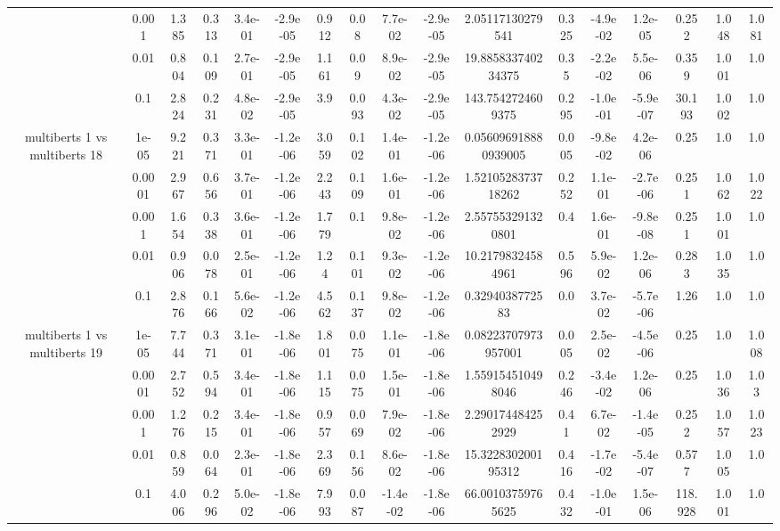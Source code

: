 \begin{tabular}{|c|c|c|c|c|c|c|c|c|c|c|c|c|c|c|c|c|}
 & 0.001 & 1.385 & 0.313 & 3.4e-01 & -2.9e-05 & 0.912 & 0.08 & 7.7e-02 & -2.9e-05 & 2.05117130279541 & 0.325 & -4.9e-02 & 1.2e-05 & 0.252 & 1.048 & 1.081 \\
 & 0.01 & 0.804 & 0.109 & 2.7e-01 & -2.9e-05 & 1.161 & 0.09 & 8.9e-02 & -2.9e-05 & 19.885833740234375 & 0.35 & -2.2e-02 & 5.5e-06 & 0.359 & 1.001 & 1.0 \\
 & 0.1 & 2.824 & 0.231 & 4.8e-02 & -2.9e-05 & 3.9 & 0.093 & 4.3e-02 & -2.9e-05 & 143.7542724609375 & 0.295 & -1.0e-01 & -5.9e-07 & 30.193 & 1.002 & 1.0 \\
\hline
\multirow{5}{*}{multiberts 1 vs multiberts 18} & 1e-05 & 9.221 & 0.371 & 3.3e-01 & -1.2e-06 & 3.059 & 0.102 & 1.4e-01 & -1.2e-06 & 0.056096918880939005 & 0.005 & -9.8e-02 & 4.2e-06 & 0.25 & 1.0 & 1.0 \\
 & 0.0001 & 2.967 & 0.656 & 3.7e-01 & -1.2e-06 & 2.243 & 0.109 & 1.6e-01 & -1.2e-06 & 1.5210528373718262 & 0.252 & 1.1e-01 & -2.7e-06 & 0.251 & 1.062 & 1.022 \\
 & 0.001 & 1.654 & 0.338 & 3.6e-01 & -1.2e-06 & 1.779 & 0.1 & 9.8e-02 & -1.2e-06 & 2.557553291320801 & 0.4 & 1.6e-01 & -9.8e-08 & 0.251 & 1.001 & 1.0 \\
 & 0.01 & 0.906 & 0.078 & 2.5e-01 & -1.2e-06 & 1.24 & 0.101 & 9.3e-02 & -1.2e-06 & 10.21798324584961 & 0.596 & 5.9e-02 & 1.2e-06 & 0.283 & 1.035 & 1.0 \\
 & 0.1 & 2.876 & 0.166 & 5.6e-02 & -1.2e-06 & 4.562 & 0.137 & 9.8e-02 & -1.2e-06 & 0.3294038772583 & 0.0 & 3.7e-02 & -5.7e-06 & 1.26 & 1.0 & 1.0 \\
\hline
\multirow{5}{*}{multiberts 1 vs multiberts 19} & 1e-05 & 7.744 & 0.371 & 3.1e-01 & -1.8e-06 & 1.801 & 0.075 & 1.1e-01 & -1.8e-06 & 0.08223707973957001 & 0.005 & 2.5e-02 & -4.5e-06 & 0.25 & 1.0 & 1.008 \\
 & 0.0001 & 2.752 & 0.594 & 3.4e-01 & -1.8e-06 & 1.115 & 0.075 & 1.5e-01 & -1.8e-06 & 1.559154510498046 & 0.246 & -3.4e-02 & 1.2e-06 & 0.25 & 1.036 & 1.03 \\
 & 0.001 & 1.276 & 0.215 & 3.4e-01 & -1.8e-06 & 0.957 & 0.069 & 7.9e-02 & -1.8e-06 & 2.290174484252929 & 0.41 & 6.7e-02 & -1.4e-05 & 0.252 & 1.057 & 1.023 \\
 & 0.01 & 0.859 & 0.064 & 2.3e-01 & -1.8e-06 & 2.369 & 0.156 & 8.6e-02 & -1.8e-06 & 15.322830200195312 & 0.416 & -1.7e-02 & -5.4e-07 & 0.577 & 1.005 & 1.0 \\
 & 0.1 & 4.006 & 0.296 & 5.0e-02 & -1.8e-06 & 7.993 & 0.087 & -1.4e-02 & -1.8e-06 & 66.00103759765625 & 0.432 & -1.0e-01 & 1.5e-06 & 118.928 & 1.001 & 1.0 \\

\end{tabular}
